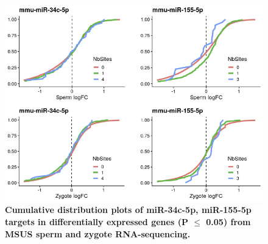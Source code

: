 \documentclass[12pt,twoside]{reedthesis}
\begin{document}
\begin{figure}[htbp]

{\centering \includegraphics{thesis_files/figure-latex/es5-1} 

}

\caption[Cumulative distribution plots of miRNA targets in differentially expressed genes]{\textbf{Cumulative distribution plots of miR-34c-5p, miR-155-5p targets in differentially expressed genes (P $\le$ 0.05) from MSUS sperm and zygote RNA-sequencing.}}\label{fig:es5}
\end{figure}
\end{document}
